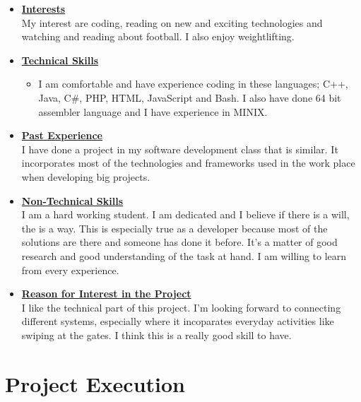\documentclass[a4paper,12pt]{article}
\begin{document}
\begin{itemize}
\item {\large \underline{\textbf{Interests}}}\\[0.2cm]
My interest are coding, reading on new and exciting technologies  and watching and reading about football. I also enjoy weightlifting.

\item {\large \underline{\textbf{Technical Skills}}}

	\begin{itemize}
		\item I am comfortable and have experience coding in these languages; C++, Java, C\#, PHP, HTML, JavaScript and Bash. I also have done 64 bit assembler language and I have experience in MINIX.
	\end{itemize}
\bigskip
\item {\large \underline{\textbf{Past Experience}}}\\[0.2cm]
I have done a project in my software development class that is similar. It incorporates  most of the technologies and frameworks used in the work place when developing big projects.
\\
\item {\large \underline{\textbf{Non-Technical Skills}}}\\[0.2cm]
 I am a hard working student. I am dedicated and I believe if there is a will, the is a way. This is especially true as a developer because most of the solutions are there and someone has done it before. It's a matter of good research and good understanding of the task at hand. I am willing to learn from every experience. 
\\
\item {\large \underline{\textbf{Reason for Interest in the Project}}}\\[0.2cm]
I like the technical part of this project. I'm looking forward to connecting different systems, especially where it incoparates everyday activities like swiping at the gates. I think this is a really good skill to have.

\end{itemize}

\newpage

\section{Project Execution}
\end{document}
